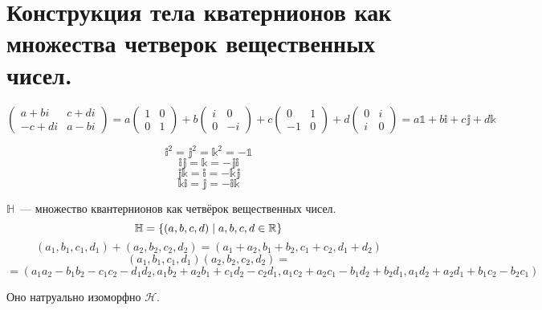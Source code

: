 \section{Конструкция тела кватернионов как множества четверок вещественных чисел.}
$$\left(\begin{matrix}a + bi & c+di \\ -c+di & a-bi\end{matrix}\right) = a \left(\begin{matrix}1 & 0 \\ 0 & 1\end{matrix}\right) + b \left(\begin{matrix}i & 0 \\ 0 & -i\end{matrix}\right) + c\left(\begin{matrix}0 & 1 \\ -1 & 0\end{matrix}\right) + d\left(\begin{matrix}0 & i \\ i & 0\end{matrix}\right) = a\mathbb{1} + b\mathbb{i} + c\mathbb{j} + d\mathbb{k}$$

$$\mathbb{i}^2 = \mathbb{j}^2 = \mathbb{k}^2 = -\mathbb{1}$$
$$\mathbb{ij} = \mathbb{k} = -\mathbb{ji}$$
$$\mathbb{jk} = \mathbb{i} = -\mathbb{kj}$$
$$\mathbb{ki} = \mathbb{j} = -\mathbb{ik}$$

\begin{Def}
$\mathbb{H}$~--- множество квантернионов как четвёрок вещественных чисел.
$$\mathbb{H} = \left\{(a, b, c, d) \mid a, b, c, d \in \mathbb{R}\right\}$$
$$(a_1, b_1, c_1, d_1) + (a_2, b_2, c_2, d_2) = (a_1 + a_2, b_1 + b_2, c_1 + c_2, d_1 + d_2)$$
$$(a_1, b_1, c_1, d_1) (a_2, b_2, c_2, d_2) = $$
$$ = (a_1a_2 - b_1b_2 - c_1c_2 - d_1d_2, a_1b_2 + a_2b_1 + c_1d_2 - c_2d_1, a_1c_2 + a_2c_1 - b_1d_2 + b_2d_1, a_1d_2 + a_2d_1 + b_1c_2 - b_2c_1)$$
\end{Def}
Оно натруально изоморфно $\mathcal{H}$.